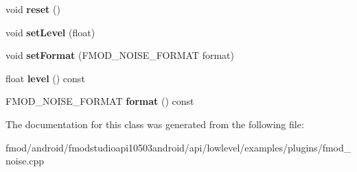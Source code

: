 \begin{DoxyCompactItemize}
\item 
\hypertarget{class_f_m_o_d_noise_state_a7c9def298fdd6b60e61d5595c69c27d6}{void {\bfseries reset} ()}\label{class_f_m_o_d_noise_state_a7c9def298fdd6b60e61d5595c69c27d6}

\item 
\hypertarget{class_f_m_o_d_noise_state_af6c9800805be5596fbaaeaadb9a9a6d2}{void {\bfseries set\+Level} (float)}\label{class_f_m_o_d_noise_state_af6c9800805be5596fbaaeaadb9a9a6d2}

\item 
\hypertarget{class_f_m_o_d_noise_state_a745166f54b6b89ec8ab3f33e74f2e15f}{void {\bfseries set\+Format} (F\+M\+O\+D\+\_\+\+N\+O\+I\+S\+E\+\_\+\+F\+O\+R\+M\+A\+T format)}\label{class_f_m_o_d_noise_state_a745166f54b6b89ec8ab3f33e74f2e15f}

\item 
\hypertarget{class_f_m_o_d_noise_state_af01871265560a325320f54b4e7e8f1e6}{float {\bfseries level} () const }\label{class_f_m_o_d_noise_state_af01871265560a325320f54b4e7e8f1e6}

\item 
\hypertarget{class_f_m_o_d_noise_state_af426ae51a60088c077d35bd1028eee6f}{F\+M\+O\+D\+\_\+\+N\+O\+I\+S\+E\+\_\+\+F\+O\+R\+M\+A\+T {\bfseries format} () const }\label{class_f_m_o_d_noise_state_af426ae51a60088c077d35bd1028eee6f}

\end{DoxyCompactItemize}


The documentation for this class was generated from the following file\+:\begin{DoxyCompactItemize}
\item 
fmod/android/fmodstudioapi10503android/api/lowlevel/examples/plugins/fmod\+\_\+noise.\+cpp\end{DoxyCompactItemize}
